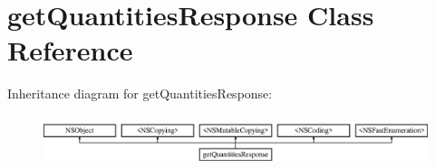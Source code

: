\hypertarget{interfaceget_quantities_response}{}\section{get\+Quantities\+Response Class Reference}
\label{interfaceget_quantities_response}
Inheritance diagram for get\+Quantities\+Response\+:\begin{figure}[H]
\begin{center}
\leavevmode
\includegraphics[height=1.513514cm]{interfaceget_quantities_response}
\end{center}
\end{figure}
